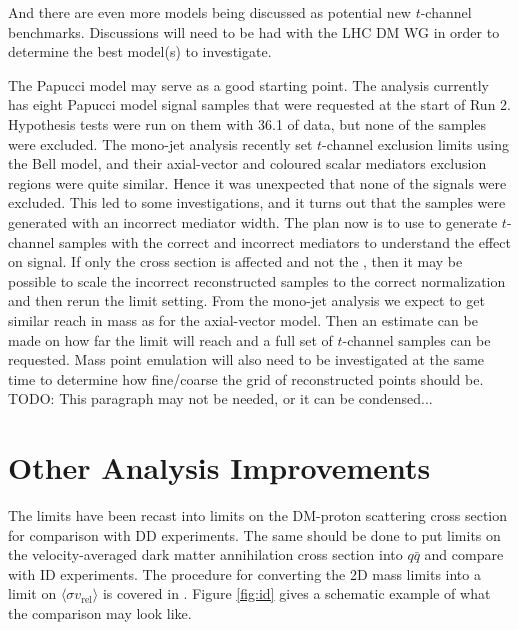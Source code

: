 And there are even more models \cite{Bauer:2017fsw} being discussed as potential new $t$-channel benchmarks. Discussions will need to be had with the LHC DM WG in order to determine the best model(s) to investigate.

The Papucci model may serve as a good starting point. The \monoZ analysis currently has eight Papucci model signal samples that were requested at the start of Run 2. Hypothesis tests were run on them with 36.1 \ifb of data, but none of the samples were excluded. The mono-jet analysis recently set $t$-channel exclusion limits using the Bell model, and their axial-vector and coloured scalar mediators exclusion regions were quite similar. Hence it was unexpected that none of the \monoZ signals were excluded. This led to some investigations, and it turns out that the \monoZ samples were generated with an incorrect mediator width. The plan now is to use \madgraph to generate $t$-channel samples with the correct and incorrect mediators to understand the effect on signal. If only the cross section is affected and not the \etmiss, then it may be possible to scale the incorrect reconstructed samples to the correct normalization and then rerun the limit setting. From the mono-jet analysis we expect to get similar reach in mass as for the axial-vector model. Then an estimate can be made on how far the limit will reach and a full set of $t$-channel samples can be requested. Mass point emulation will also need to be investigated at the same time to determine how fine/coarse the grid of reconstructed points should be. {\color{red}TODO: This paragraph may not be needed, or it can be condensed...}

\section{Other Analysis Improvements}

The \monoZ limits have been recast into limits on the DM-proton scattering cross section for comparison with DD experiments. The same should be done to put limits on the velocity-averaged dark matter annihilation cross section into $q\bar{q}$ and compare with ID experiments. The procedure for converting the 2D mass limits into a limit on $\langle \sigma v_\text{rel} \rangle$ is covered in \cite{Boveia:2016mrp}. Figure \ref{fig:id} gives a schematic example of what the comparison may look like.

